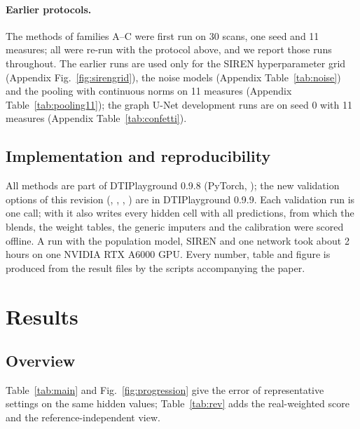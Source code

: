 \documentclass[11pt]{article}
\newcommand{\ratio}{\ensuremath{\rho}}
\begin{document}
\paragraph{Earlier protocols.} The methods of families A--C were first run on 30 scans, one seed and 11 measures; all were
re-run with the protocol above, and we report those runs throughout. The earlier runs are used only for the SIREN
hyperparameter grid (Appendix Fig.~\ref{fig:sirengrid}), the noise models (Appendix Table~\ref{tab:noise}) and the
pooling with continuous norms on 11 measures (Appendix Table~\ref{tab:pooling11}); the graph U-Net development runs are on
seed 0 with 11 measures (Appendix Table~\ref{tab:confetti}).

\subsection{Implementation and reproducibility}

All methods are part of DTIPlayground 0.9.8 \citep{dtiplayground} (PyTorch, \citealp{paszke2019pytorch}); the new
validation options of this revision (, ,
, ) are in DTIPlayground 0.9.9. Each validation run is
one  call; with  it also writes every
hidden cell with all predictions, from which the blends, the weight tables, the generic imputers and the calibration were
scored offline. A run with the population model, SIREN and one network took about 2 hours on one NVIDIA RTX A6000 GPU.
Every number, table and figure is produced from the result files by the scripts accompanying the paper.

\section{Results}

\subsection{Overview}

Table~\ref{tab:main} and Fig.~\ref{fig:progression} give the error of representative settings on the same hidden
values; Table~\ref{tab:rev} adds the real-weighted score and the reference-independent view.

\begin{table}[p]
\centering\footnotesize
\caption{Error relative to the age-bin mean (RMSE ratio $\ratio$; below 1: better) on identical hidden values, mean over
3 seeds $\times$ 54 BCP scans, 7 measures and 3 age bins. Overall: mean of the four patterns (SD between seeds).
$^{\dagger}$Leaves some hidden values, counted with the age-bin mean (families A--B never fill a whole family).
$^{\ast}$Weights cross-fitted by subject; mean of the per-seed scores (pooled over seeds: 0.567 and 0.538).}\label{tab:main}
\setlength{\tabcolsep}{4pt}
\resizebox{\textwidth}{!}{}
\end{table}
\end{document}

